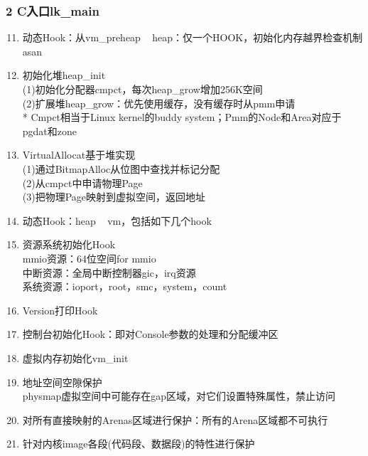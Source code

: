 \documentclass[
8pt, %
]{beamer}
\begin{document}
	\begin{frame}
		\frametitle{2 C入口lk\_main}
		\begin{enumerate}\setcounter{enumi}{10}
			\item 动态Hook：从vm\_preheap ~ heap：仅一个HOOK，初始化内存越界检查机制asan
			\item 初始化堆heap\_init\\
			(1)初始化分配器cmpct，每次heap\_grow增加256K空间\\
			(2)扩展堆heap\_grow：优先使用缓存，没有缓存时从pmm申请\\
			* Cmpct相当于Linux kernel的buddy system；Pmm的Node和Area对应于pgdat和zone
			\item VirtualAllocat基于堆实现\\
			(1)通过BitmapAlloc从位图中查找并标记分配\\
			(2)从cmpct中申请物理Page\\
			(3)把物理Page映射到虚拟空间，返回地址
			\item 动态Hook：heap ~ vm，包括如下几个hook
			\item 资源系统初始化Hook\\
			mmio资源：64位空间for mmio\\
			中断资源：全局中断控制器gic，irq资源\\
			系统资源：ioport，root，smc，system，count
			\item Version打印Hook
			\item 控制台初始化Hook：即对Console参数的处理和分配缓冲区
			\item 虚拟内存初始化vm\_init
			\item 地址空间空隙保护\\
			physmap虚拟空间中可能存在gap区域，对它们设置特殊属性，禁止访问
			\item 对所有直接映射的Arenas区域进行保护：所有的Arena区域都不可执行
			\item 针对内核image各段(代码段、数据段)的特性进行保护
		\end{enumerate}
	\end{frame}
\end{document}
